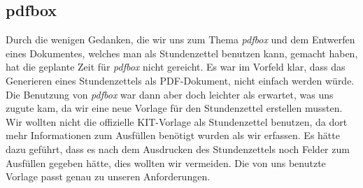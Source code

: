 \subsection{pdfbox}
Durch die wenigen Gedanken, die wir uns zum Thema \emph{pdfbox} und dem Entwerfen eines Dokumentes, welches man als Stundenzettel benutzen kann, gemacht haben, hat die geplante Zeit für \emph{pdfbox} nicht gereicht. Es war im Vorfeld klar, dass das Generieren eines Stundenzettels als PDF-Dokument, nicht einfach werden würde.
Die Benutzung von \emph{pdfbox} war dann aber doch leichter als erwartet, was uns zugute kam, da wir eine neue Vorlage für den Stundenzettel erstellen mussten. Wir wollten nicht die offizielle KIT-Vorlage als Stundenzettel benutzen, da dort mehr Informationen zum Ausfüllen benötigt wurden als wir erfassen. Es hätte dazu geführt, dass es nach dem Ausdrucken des Stundenzettels noch Felder zum Ausfüllen gegeben hätte, dies wollten wir vermeiden. Die von uns benutzte Vorlage passt genau zu unseren Anforderungen.

